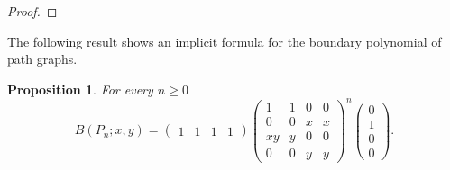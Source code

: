 \documentclass[review]{elsarticle}
\newtheorem{proposition}[theorem]{Proposition}
\begin{document}
\begin{proof}
\end{proof}

The following result shows an implicit formula for the boundary polynomial of path graphs.


\begin{proposition}\label{p:Pn}
 For every $n\ge 0$
 \begin{equation}\label{eq:Pn}
 B(P_n;x,y)=  \left(\begin{array}{cccc}1&1&1&1\end{array}\right)
 \left(\begin{array}{cccc} 1 & 1 & 0 & 0 \\ 0 & 0 & x & x \\ xy & y & 0 & 0 \\ 0 & 0 & y & y \end{array}\right)^{n}
 \left(\begin{array}{c}0\\1\\0\\0\end{array}\right).
 \end{equation}
\end{proposition}
\end{document}
